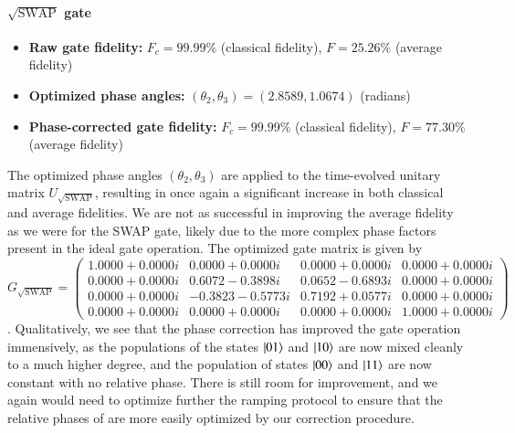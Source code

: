 \documentclass{subfiles}
\begin{document}
\paragraph{$\sqrt{\text{SWAP}}$ gate}
\begin{itemize}
    \item \textbf{Raw gate fidelity:} $F_c = 99.99\%$ (classical fidelity), $F = 25.26\%$ (average fidelity)
    \item \textbf{Optimized phase angles:} $(\theta_2, \theta_3) = (2.8589, 1.0674)$ (radians)
    \item \textbf{Phase-corrected gate fidelity:} $F_c = 99.99\%$ (classical fidelity), $F = 77.30\%$ (average fidelity)
\end{itemize}
The optimized phase angles $(\theta_2, \theta_3)$ are applied to the time-evolved unitary matrix $U_{\sqrt{\text{SWAP}}}$, resulting in once again a significant increase in both classical and average fidelities. We are not as successful in improving the average fidelity as we were for the SWAP gate, likely due to the more complex phase factors present in the ideal gate operation.
The optimized gate matrix is given by
\begin{equation}
G_{\sqrt{\mathrm{SWAP}}}
=
\begin{pmatrix}
 1.0000 + 0.0000i & 0.0000 + 0.0000i & 0.0000 + 0.0000i & 0.0000 + 0.0000i\\
 0.0000 + 0.0000i & 0.6072 - 0.3898i & 0.0652 - 0.6893i & 0.0000 + 0.0000i\\
 0.0000 + 0.0000i & -0.3823 - 0.5773i & 0.7192 + 0.0577i & 0.0000 + 0.0000i\\
 0.0000 + 0.0000i & 0.0000 + 0.0000i & 0.0000 + 0.0000i & 1.0000 + 0.0000i
\end{pmatrix}
\end{equation}.
Qualitatively, we see that the phase correction has improved the gate operation immensively, as the populations of the states $\ket{01}$ and $\ket{10}$ are now mixed cleanly to a much higher degree, and the population of states $\ket{00}$ and $\ket{11}$ are now constant with no relative phase. There is still room for improvement, and we again would need to optimize further the ramping protocol to ensure that the relative phases of are more easily optimized by our correction procedure.
\end{document}
